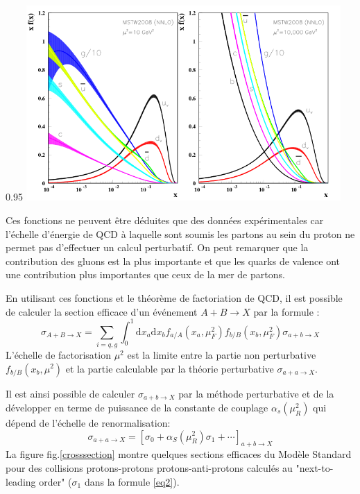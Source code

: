 \begin{minipagewithmarginpars}[h]{0.95\textwidth}
	\centering
	\includegraphics[width=0.9\textwidth]{LHC/pdf.png}
	\label{pdf}	
\end{minipagewithmarginpars}
 
Ces fonctions ne peuvent être déduites que des données expérimentales car l'échelle d'énergie de QCD à laquelle sont soumis les partons au sein du proton ne permet pas d'effectuer un calcul perturbatif. On peut remarquer que la contribution des gluons est la plus importante et que les quarks de valence ont une contribution plus importantes que ceux de la mer de partons.

En utilisant ces fonctions et le théorème de factoriation de QCD, il est possible de calculer la section efficace d'un événement $A+B\rightarrow X$ par la formule :
\begin{equation}
\sigma_{A+B\rightarrow X}=\sum_{i=q,g}\int_{0}^{1} \mathrm{d}x_{a}\mathrm{d}x_{b}f_{a/A}(x_{a},\mu_{F}^{2})f_{b/B}(x_{b},\mu_{F}^{2})\sigma{_{a+b\rightarrow X}}
\end{equation}
L'échelle de factorisation $\mu^{2}$ est la limite entre la partie non perturbative $f_{b/B}(x_{b},\mu^{2})$ et la partie calculable par la théorie perturbative $\sigma{_{a+a\rightarrow X}}$.

Il est ainsi possible de calculer $\sigma{_{a+b\rightarrow X}}$ par la méthode perturbative et de la développer en terme de puissance de la constante de couplage $\alpha_{s}\left(\mu_{R}^{2}\right)$ qui dépend de l'échelle de renormalisation:
\begin{equation}
\sigma_{a+a\rightarrow X}=\left[\sigma_{0}+\alpha_{S}\left(\mu_{R}^{2}\right)\sigma_{1}+\cdots\right]_{a+b\rightarrow X}
\label{eq2}
\end{equation}
La figure fig.\ref{crosssection} montre quelques sections efficaces du Modèle Standard pour des collisions protons-protons protons-anti-protons calculés au "next-to-leading order" ($\sigma_{1}$ dans la formule \ref{eq2}).

